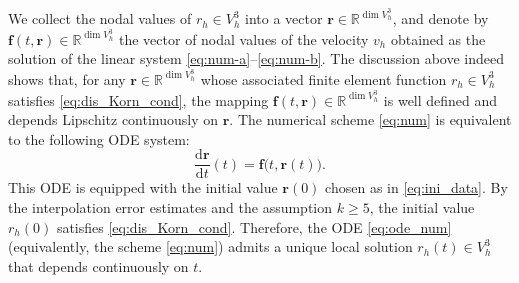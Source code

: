 \documentclass[11pt,a4paper,oneside,reqno]{amsart}
\theoremstyle{definition}
\theoremstyle{plain}
\numberwithin{theorem}{section}
\numberwithin{proposition}{section}
\numberwithin{lemma}{section}
\numberwithin{equation}{section}
\begin{document}
We collect the nodal values of \(r_h\in V_h^3\) into a vector \(\mathbf r \in \mathbb{R}^{\dim V_h^3}\),
and denote by \(\mathbf f(t,\mathbf r)\in \mathbb{R}^{\dim V_h^3}\) the vector of nodal values of the velocity \(v_h\) obtained as the solution of the linear system \eqref{eq:num-a}--\eqref{eq:num-b}.
The discussion above indeed shows that, for any \(\mathbf r \in \mathbb{R}^{\dim V_h^3}\) whose associated finite element function
\(r_h\in V_h^3\) satisfies \eqref{eq:dis_Korn_cond}, the mapping \(\mathbf f(t,\mathbf r)\in \mathbb{R}^{\dim V_h^3}\)
is well defined and depends Lipschitz continuously on \(\mathbf r\).
The numerical scheme \eqref{eq:num} is equivalent to the following ODE system:
\begin{equation}\label{eq:ode_num}
\frac{\mathrm d \mathbf r}{\mathrm d t}(t)=\mathbf f\bigl(t,\mathbf r(t)\bigr).
\end{equation}
This ODE is equipped with the initial value \(\mathbf r(0)\) chosen as in \eqref{eq:ini_data}.
By the interpolation error estimates and the assumption \(k\ge 5\), the initial value \(r_h(0)\) satisfies \eqref{eq:dis_Korn_cond}.
Therefore, the ODE \eqref{eq:ode_num} (equivalently, the scheme \eqref{eq:num}) admits a unique local solution \(r_h(t) \in V_h^3\)
that depends continuously on \(t\).
\end{document}
